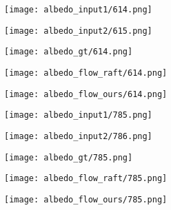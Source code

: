 \documentclass[10pt,twocolumn,letterpaper]{article}
\begin{document}
\begin{figure*}[ht!]
     \begin{subfigure}[b]{0.195\textwidth}
         \centering
         \texttt{[image: albedo\_input1/614.png]}
     \end{subfigure}\hfill
     \begin{subfigure}[b]{0.195\textwidth}
         \centering
         \texttt{[image: albedo\_input2/615.png]}
     \end{subfigure}\hfill
     \begin{subfigure}[b]{0.195\textwidth}
         \centering
         \texttt{[image: albedo\_gt/614.png]}
     \end{subfigure}\hfill
     \begin{subfigure}[b]{0.195\textwidth}
         \centering
         \texttt{[image: albedo\_flow\_raft/614.png]}
     \end{subfigure}\hfill
     \begin{subfigure}[b]{0.195\textwidth}
         \centering
         \texttt{[image: albedo\_flow\_ours/614.png]}
     \end{subfigure}

     \begin{subfigure}[b]{0.195\textwidth}
         \centering
         \texttt{[image: albedo\_input1/785.png]}
     \end{subfigure}\hfill
     \begin{subfigure}[b]{0.195\textwidth}
         \centering
         \texttt{[image: albedo\_input2/786.png]}
     \end{subfigure}\hfill
     \begin{subfigure}[b]{0.195\textwidth}
         \centering
         \texttt{[image: albedo\_gt/785.png]}
     \end{subfigure}\hfill
     \begin{subfigure}[b]{0.195\textwidth}
         \centering
         \texttt{[image: albedo\_flow\_raft/785.png]}
     \end{subfigure}\hfill
     \begin{subfigure}[b]{0.195\textwidth}
         \centering
         \texttt{[image: albedo\_flow\_ours/785.png]}
     \end{subfigure}


\end{figure*}
\end{document}
